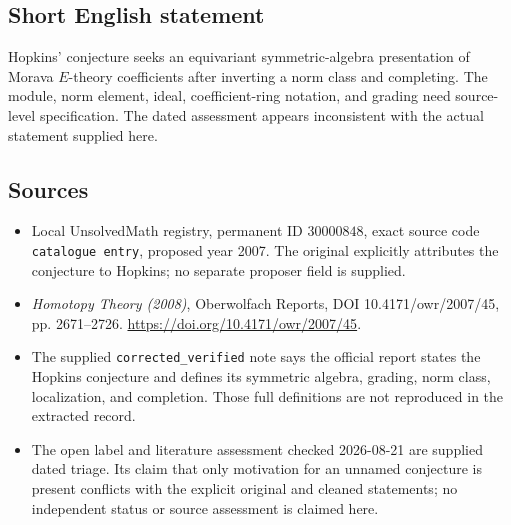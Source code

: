 \documentclass[11pt]{article}
\begin{document}
\subsection{Short English statement}
Hopkins' conjecture seeks an equivariant symmetric-algebra presentation of Morava \(E\)-theory coefficients after inverting a norm class and completing. The module, norm element, ideal, coefficient-ring notation, and grading need source-level specification. The dated assessment appears inconsistent with the actual statement supplied here.
\subsection{Sources}
\begin{itemize}
\item Local UnsolvedMath registry, permanent ID \(30000848\), exact source code \texttt{catalogue entry}, proposed year 2007. The original explicitly attributes the conjecture to Hopkins; no separate proposer field is supplied.
\item \emph{Homotopy Theory (2008)}, Oberwolfach Reports, DOI 10.4171/owr/2007/45, pp. 2671--2726. \url{https://doi.org/10.4171/owr/2007/45}.
\item The supplied \texttt{corrected\_verified} note says the official report states the Hopkins conjecture and defines its symmetric algebra, grading, norm class, localization, and completion. Those full definitions are not reproduced in the extracted record.
\item The open label and literature assessment checked 2026-08-21 are supplied dated triage. Its claim that only motivation for an unnamed conjecture is present conflicts with the explicit original and cleaned statements; no independent status or source assessment is claimed here.
\end{itemize}
\end{document}
